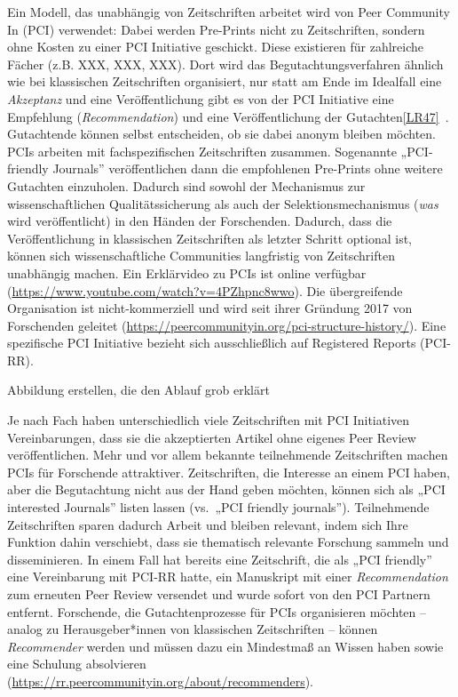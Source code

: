 \documentclass[
  letterpaper,
  DIV=11,
  numbers=noendperiod]{scrreprt}
\begin{document}
Ein Modell, das unabhängig von Zeitschriften arbeitet wird von Peer
Community In (PCI) verwendet: Dabei werden Pre-Prints nicht zu
Zeitschriften, sondern ohne Kosten zu einer PCI Initiative geschickt.
Diese existieren für zahlreiche Fächer (z.B. XXX, XXX, XXX). Dort wird
das Begutachtungsverfahren ähnlich wie bei klassischen Zeitschriften
organisiert, nur statt am Ende im Idealfall eine \emph{Akzeptanz} und
eine Veröffentlichung gibt es von der PCI Initiative eine Empfehlung
(\emph{Recommendation}) und eine Veröffentlichung der
Gutachten\hyperref[_msocom_47]{{[}LR47{]}}~. Gutachtende können selbst
entscheiden, ob sie dabei anonym bleiben möchten. PCIs arbeiten mit
fachspezifischen Zeitschriften zusammen. Sogenannte „PCI-friendly
Journals'' veröffentlichen dann die empfohlenen Pre-Prints ohne weitere
Gutachten einzuholen. Dadurch sind sowohl der Mechanismus zur
wissenschaftlichen Qualitätssicherung als auch der Selektionsmechanismus
(\emph{was} wird veröffentlicht) in den Händen der Forschenden. Dadurch,
dass die Veröffentlichung in klassischen Zeitschriften als letzter
Schritt optional ist, können sich wissenschaftliche Communities
langfristig von Zeitschriften unabhängig machen. Ein Erklärvideo zu PCIs
ist online verfügbar
(\url{https://www.youtube.com/watch?v=4PZhpnc8wwo}). Die übergreifende
Organisation ist nicht-kommerziell und wird seit ihrer Gründung 2017 von
Forschenden geleitet
(\url{https://peercommunityin.org/pci-structure-history/}). Eine
spezifische PCI Initiative bezieht sich ausschließlich auf Registered
Reports (PCI-RR).

Abbildung erstellen, die den Ablauf grob erklärt

Je nach Fach haben unterschiedlich viele Zeitschriften mit PCI
Initiativen Vereinbarungen, dass sie die akzeptierten Artikel ohne
eigenes Peer Review veröffentlichen. Mehr und vor allem bekannte
teilnehmende Zeitschriften machen PCIs für Forschende attraktiver.
Zeitschriften, die Interesse an einem PCI haben, aber die Begutachtung
nicht aus der Hand geben möchten, können sich als „PCI interested
Journals'' listen lassen (vs.~„PCI friendly journals''). Teilnehmende
Zeitschriften sparen dadurch Arbeit und bleiben relevant, indem sich
Ihre Funktion dahin verschiebt, dass sie thematisch relevante Forschung
sammeln und disseminieren. In einem Fall hat bereits eine Zeitschrift,
die als „PCI friendly'' eine Vereinbarung mit PCI-RR hatte, ein
Manuskript mit einer \emph{Recommendation} zum erneuten Peer Review
versendet und wurde sofort von den PCI Partnern entfernt. Forschende,
die Gutachtenprozesse für PCIs organisieren möchten -- analog zu
Herausgeber*innen von klassischen Zeitschriften -- können
\emph{Recommender} werden und müssen dazu ein Mindestmaß an Wissen haben
sowie eine Schulung absolvieren
(\url{https://rr.peercommunityin.org/about/recommenders}).
\end{document}
